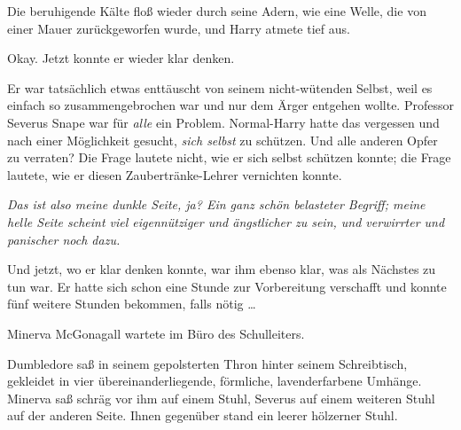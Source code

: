 Die beruhigende Kälte floß wieder durch seine Adern, wie eine Welle, die von einer Mauer zurückgeworfen wurde, und Harry atmete tief aus. 

Okay. Jetzt konnte er wieder klar denken. 

Er war tatsächlich etwas enttäuscht von seinem nicht-wütenden Selbst, weil es einfach so zusammengebrochen war und nur dem Ärger entgehen wollte. Professor Severus Snape war für \emph{alle} ein Problem. Normal-Harry hatte das vergessen und nach einer Möglichkeit gesucht, \emph{sich selbst} zu schützen. Und alle anderen Opfer zu verraten? Die Frage lautete nicht, wie er sich selbst schützen konnte; die Frage lautete, wie er diesen Zaubertränke-Lehrer vernichten konnte. 

\emph{Das ist also meine dunkle Seite, ja? Ein ganz schön belasteter Begriff; meine helle Seite scheint viel eigennütziger und ängstlicher zu sein, und verwirrter und panischer noch dazu.} 

Und jetzt, wo er klar denken konnte, war ihm ebenso klar, was als Nächstes zu tun war. Er hatte sich schon eine Stunde zur Vorbereitung verschafft und konnte fünf weitere Stunden bekommen, falls nötig … 

\later

Minerva McGonagall wartete im Büro des Schulleiters. 

Dumbledore saß in seinem gepolsterten Thron hinter seinem Schreibtisch, gekleidet in vier übereinanderliegende, förmliche, lavenderfarbene Umhänge. Minerva saß schräg vor ihm auf einem Stuhl, Severus auf einem weiteren Stuhl auf der anderen Seite. Ihnen gegenüber stand ein leerer hölzerner Stuhl. 

